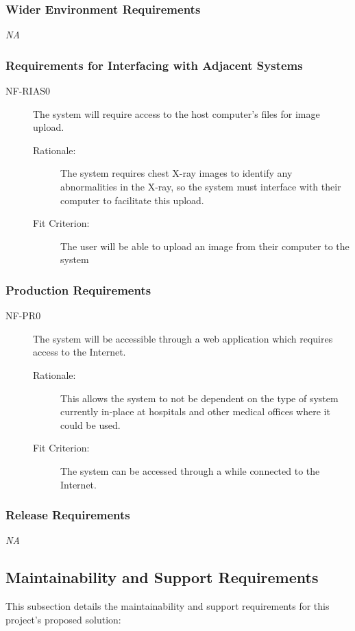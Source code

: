 \documentclass[12pt]{article}
\begin{document}
\subsubsection{Wider Environment Requirements}
\textit{NA}

\subsubsection{Requirements for Interfacing with Adjacent Systems}
\begin{description}
    \item[NF-RIAS0] The system will require access to the host computer's files for image upload. 
    \begin{description}
        \item[Rationale:] The system requires chest X-ray images to identify any abnormalities in the X-ray, so the system must interface with their computer to facilitate this upload.  
        \item[Fit Criterion:] The user will be able to upload an image from their computer to the system
    \end{description}
\end{description}

\subsubsection{Production Requirements}
\begin{description}
    \item[NF-PR0] The system will be accessible through a web application which requires access to the Internet.  
    \begin{description}
        \item[Rationale:] This allows the system to not be dependent on the type of system currently in-place at hospitals and other medical offices where it could be used. 
        \item[Fit Criterion:] The system can be accessed through a while connected to the Internet. 
    \end{description}
\end{description}

\subsubsection{Release Requirements}
\textit{NA}

\subsection{Maintainability and Support Requirements}
This subsection details the maintainability and support requirements for this project's proposed solution: 
\end{document}
